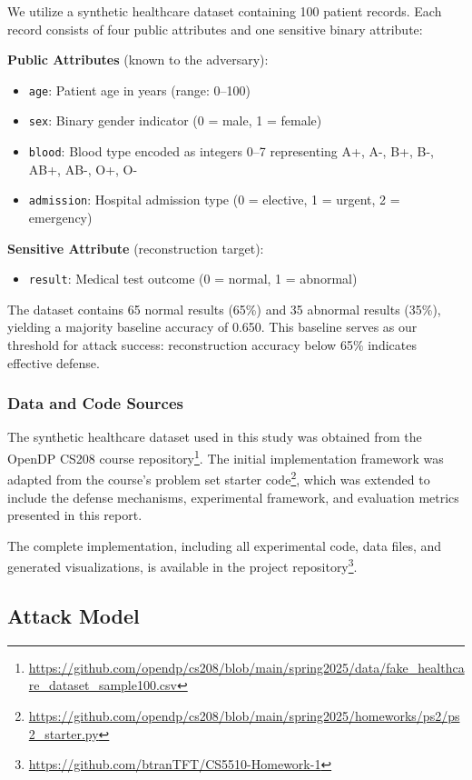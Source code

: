 \documentclass[11pt,letterpaper]{article}
\begin{document}
We utilize a synthetic healthcare dataset containing 100 patient records. Each record consists of four public attributes and one sensitive binary attribute:

\textbf{Public Attributes} (known to the adversary):
\begin{itemize}[leftmargin=*]
    \item \texttt{age}: Patient age in years (range: 0--100)
    \item \texttt{sex}: Binary gender indicator (0 = male, 1 = female)
    \item \texttt{blood}: Blood type encoded as integers 0--7 representing A+, A-, B+, B-, AB+, AB-, O+, O-
    \item \texttt{admission}: Hospital admission type (0 = elective, 1 = urgent, 2 = emergency)
\end{itemize}

\textbf{Sensitive Attribute} (reconstruction target):
\begin{itemize}[leftmargin=*]
    \item \texttt{result}: Medical test outcome (0 = normal, 1 = abnormal)
\end{itemize}

The dataset contains 65 normal results (65\%) and 35 abnormal results (35\%), yielding a majority baseline accuracy of 0.650. This baseline serves as our threshold for attack success: reconstruction accuracy below 65\% indicates effective defense.

\subsubsection{Data and Code Sources}

The synthetic healthcare dataset used in this study was obtained from the OpenDP CS208 course repository\footnote{\url{https://github.com/opendp/cs208/blob/main/spring2025/data/fake_healthcare_dataset_sample100.csv}}. The initial implementation framework was adapted from the course's problem set starter code\footnote{\url{https://github.com/opendp/cs208/blob/main/spring2025/homeworks/ps2/ps2_starter.py}}, which was extended to include the defense mechanisms, experimental framework, and evaluation metrics presented in this report.

The complete implementation, including all experimental code, data files, and generated visualizations, is available in the project repository\footnote{\url{https://github.com/btranTFT/CS5510-Homework-1}}.


\subsection{Attack Model}
\end{document}
